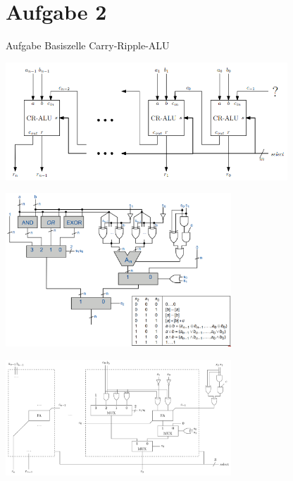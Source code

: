 
\section{Aufgabe 2}

\setcounter{exercise}{1}

\begin{frame}[allowframebreaks]{Aufgabe \thesection}{Basiszelle Carry-Ripple-ALU}

\begin{exercisenoinc}
    \center\includegraphics[width=300pt]{figures/CR-ALU.png}
\end{exercisenoinc}

\begin{requirementsnoinc}
    \center\includegraphics[width=240pt]{figures/ALU_logic.png}
\end{requirementsnoinc}

\begin{solutionnoinc}
    \center\includegraphics[width=240pt]{figures/CR-ALU-Cell.png}
\end{solutionnoinc}


\end{frame}
